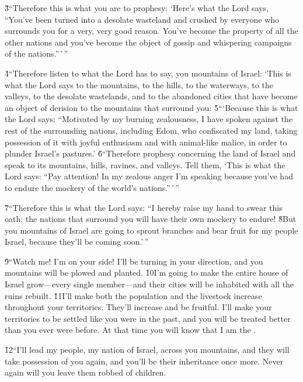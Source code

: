 \v{3}``Therefore this is what you are to prophesy: `Here's what the Lord  says, ``You've been turned into a desolate wasteland and crushed by everyone who surrounds you for a very, very good reason. You've become the property of all the other nations and you've become the object of gossip and whispering campaigns of the nations.''\,'\,''

\v{4}``Therefore listen to what the Lord  has to say, you mountains of Israel: `This is what the Lord  says to the mountains, to the hills, to the waterways, to the valleys, to the desolate wastelands, and to the abandoned cities that have become an object of derision to the mountains that surround you: \v{5}```Because this is what the Lord  says: ``Motivated by my burning zealousness, I have spoken against the rest of the surrounding nations, including Edom, who confiscated my land, taking possession of it with joyful enthusiasm and with animal-like malice, in order to plunder Israel's pastures.' \v{6}``Therefore prophesy concerning the land of Israel and speak to its mountains, hills, ravines, and valleys. Tell them, `This is what the Lord  says: ``Pay attention! In my zealous anger I'm speaking because you've had to endure the mockery of the world's nations.''\,'\,''

\v{7}``Therefore this is what the Lord  says: ``I hereby raise my hand to swear this oath: the nations that surround you will have their own mockery to endure! \v{8}But you mountains of Israel are going to sprout branches and bear fruit for my people Israel, because they'll be coming soon.'\,''

\v{9}``Watch me! I'm on your side! I'll be turning in your direction, and you mountains will be plowed and planted. \v{10}I'm going to make the entire house of Israel grow---every single member---and their cities will be inhabited with all the ruins rebuilt. \v{11}I'll make both the population and the livestock increase throughout your territories. They'll increase and be fruitful. I'll make your territories to be settled like you were in the past, and you will be treated better than you ever were before. At that time you will know that I am the .

\v{12}``I'll lead my people, my nation of Israel, across you mountains, and they will take possession of you again, and you'll be their inheritance once more. Never again will you leave them robbed of children.

